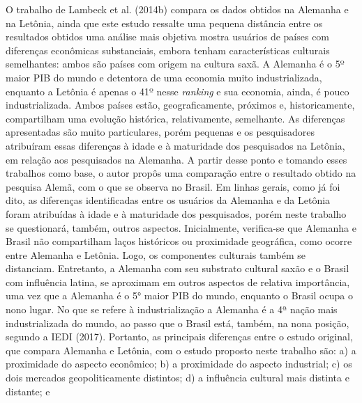 O trabalho de Lambeck et al. (2014b) compara os dados obtidos na Alemanha e na Letônia, ainda que este estudo ressalte uma pequena distância entre os resultados obtidos uma análise mais objetiva mostra usuários de países com diferenças econômicas substanciais, embora tenham características culturais semelhantes: ambos são países com origem na cultura saxã. A Alemanha é o 5º maior PIB do mundo e detentora de uma economia muito industrializada, enquanto a Letônia é apenas o 41º nesse \textit{ranking} e sua economia, ainda, é pouco industrializada.\newline
\indent Ambos países estão, geograficamente, próximos e, historicamente, compartilham uma evolução histórica, relativamente, semelhante. As diferenças apresentadas são muito particulares, porém pequenas e os pesquisadores atribuíram essas diferenças à idade e à maturidade dos pesquisados na Letônia, em relação aos pesquisados na Alemanha.\newline
\indent A partir desse ponto e tomando esses trabalhos como base, o autor propôs uma comparação entre o resultado obtido na pesquisa Alemã, com o que se observa no Brasil. Em linhas gerais, como já foi dito, as diferenças identificadas entre os usuários da Alemanha e da Letônia foram atribuídas à idade e à maturidade dos pesquisados, porém neste trabalho se questionará, também, outros aspectos.\newline
\indent Inicialmente, verifica-se que Alemanha e Brasil não compartilham laços históricos ou proximidade geográfica, como ocorre entre Alemanha e Letônia. Logo, os componentes culturais também se distanciam. Entretanto, a Alemanha com seu substrato cultural saxão e o Brasil com influência latina, se aproximam em outros aspectos de relativa importância, uma vez que a Alemanha é o 5° maior PIB do mundo, enquanto o Brasil ocupa o nono lugar. No que se refere à industrialização a Alemanha é a 4ª nação mais industrializada do mundo, ao passo que o Brasil está, também, na nona posição, segundo a IEDI (2017).\newline
\indent Portanto, as principais diferenças entre o estudo original, que compara Alemanha e Letônia, com o estudo proposto neste trabalho são:\newline
\indent a)	a proximidade do aspecto econômico;\newline
\indent b)	a proximidade do aspecto industrial;\newline
\indent c)	os dois mercados geopoliticamente distintos;\newline
\indent d)	a influência cultural mais distinta e distante; e\newline
